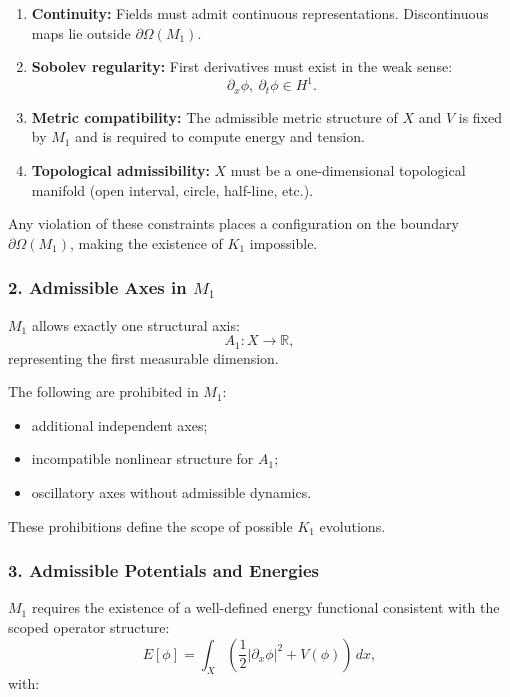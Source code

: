 \begin{enumerate}
    \item \textbf{Continuity:}  
    Fields must admit continuous representations. Discontinuous maps lie outside $\partial\Omega(M_1)$.

    \item \textbf{Sobolev regularity:}  
    First derivatives must exist in the weak sense:
    \[
    \partial_x \phi,\ \partial_t \phi \in H^1.
    \]

    \item \textbf{Metric compatibility:}  
    The admissible metric structure of $X$ and $V$ is fixed by $M_1$ and is required to compute energy and tension.

    \item \textbf{Topological admissibility:}  
    $X$ must be a one-dimensional topological manifold
    (open interval, circle, half-line, etc.).
\end{enumerate}

Any violation of these constraints places a configuration on the boundary
$\partial\Omega(M_1)$, making the existence of $K_1$ impossible.

\subsubsection*{2. Admissible Axes in \texorpdfstring{$M_1$}{M_1}}

$M_1$ allows exactly one structural axis:
\[
A_1 : X \to \mathbb{R},
\]
representing the first measurable dimension.

The following are prohibited in $M_1$:

\begin{itemize}
    \item additional independent axes;
    \item incompatible nonlinear structure for $A_1$;
    \item oscillatory axes without admissible dynamics.
\end{itemize}

These prohibitions define the scope of possible $K_1$ evolutions.

\subsubsection*{3. Admissible Potentials and Energies}

$M_1$ requires the existence of a well-defined energy functional
consistent with the scoped operator structure:
\[
E[\phi] = \int_X \left(
\frac{1}{2} |\partial_x \phi|^2 + V(\phi)
\right)\,dx,
\]
with:

